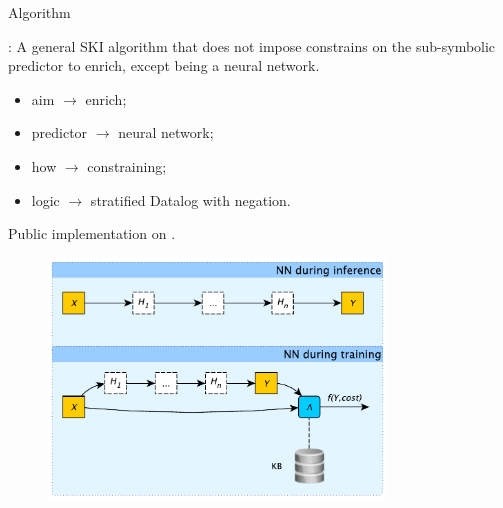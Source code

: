 \documentclass[presentation]{beamer}\mode<presentation>{\usetheme{AMSBolognaFC}}
\begin{document}
\begin{frame}[allowframebreaks]{Algorithm}
    \begin{block}{\killshort: \killlong}
        A general SKI algorithm that does not impose constrains on the sub-symbolic predictor to enrich, except being a neural network.
        \begin{itemize}
            \item aim $\rightarrow$ enrich;
            \item predictor $\rightarrow$ neural network;
            \item how $\rightarrow$ constraining;
            \item logic $\rightarrow$ stratified Datalog with negation.
        \end{itemize}
    \end{block}
    Public implementation on \psyki. 
    
    \framebreak
    
    \begin{figure}
        \centering
        \includegraphics[width=0.8\textwidth]{figures/lambda-layer.pdf}
    \end{figure}
    
    \framebreak
    
    
    
    \framebreak
    

\end{frame}
\end{document}
